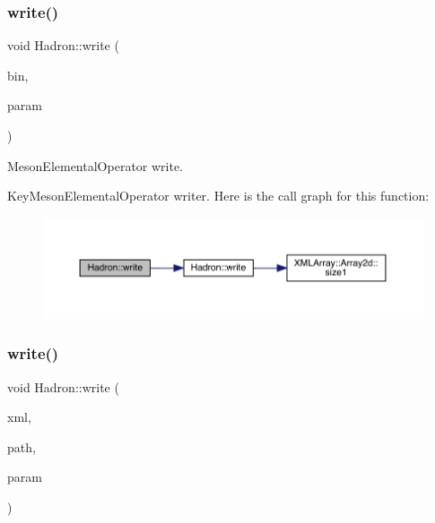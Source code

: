 \subsubsection{\texorpdfstring{write()}{write()}\hspace{0.1cm}{\footnotesize\ttfamily [40/95]}}
{\footnotesize\ttfamily void Hadron\+::write (\begin{DoxyParamCaption}\item[{\mbox{\hyperlink{classADATIO_1_1BinaryWriter}{Binary\+Writer}} \&}]{bin,  }\item[{const \mbox{\hyperlink{structHadron_1_1KeyMesonElementalOperator__t}{Key\+Meson\+Elemental\+Operator\+\_\+t}} \&}]{param }\end{DoxyParamCaption})}



Meson\+Elemental\+Operator write. 

Key\+Meson\+Elemental\+Operator writer. Here is the call graph for this function\+:
\nopagebreak
\begin{figure}[H]
\begin{center}
\leavevmode
\includegraphics[width=350pt]{d1/daf/namespaceHadron_abb7bfe7ab47ecc24ac8d489bdaf701d2_cgraph}
\end{center}
\end{figure}
\mbox{\label{namespaceHadron_a97758f7d26a76e70e4c61d4409eff7a6}} 
\subsubsection{\texorpdfstring{write()}{write()}\hspace{0.1cm}{\footnotesize\ttfamily [41/95]}}
{\footnotesize\ttfamily void Hadron\+::write (\begin{DoxyParamCaption}\item[{\mbox{\hyperlink{classADATXML_1_1XMLWriter}{X\+M\+L\+Writer}} \&}]{xml,  }\item[{const std\+::string \&}]{path,  }\item[{const \mbox{\hyperlink{structHadron_1_1KeyPropElementalOperator__t}{Key\+Prop\+Elemental\+Operator\+\_\+t}} \&}]{param }\end{DoxyParamCaption})}



